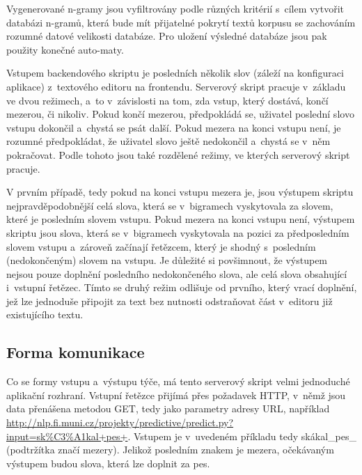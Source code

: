 \documentclass[a4paper,11pt,openany]{book} %
\newcommand\exmp{\textsf}
\begin{document}

Vygenerované n-gramy jsou vyfiltrovány podle různých kritérií s~cílem vytvořit databázi n-gramů, která bude mít přijatelné pokrytí textů korpusu se zachováním rozumné datové velikosti databáze. Pro uložení výsledné databáze jsou pak použity konečné {auto-maty}. \parencite[13]{neverilovaulipova2014}



Vstupem backendového skriptu je posledních několik slov (záleží na konfiguraci aplikace) z~textového editoru na frontendu. Serverový skript pracuje v~základu ve dvou režimech, a~to v~závislosti na tom, zda vstup, který dostává, končí mezerou, či nikoliv. Pokud končí mezerou, předpokládá se, uživatel poslední slovo vstupu dokončil a~chystá se psát další. Pokud mezera na konci vstupu není, je rozumné předpokládat, že uživatel slovo ještě nedokončil a~chystá se v~něm pokračovat. Podle tohoto jsou také rozdělené režimy, ve kterých serverový skript pracuje. 

V prvním případě, tedy pokud na konci vstupu mezera je, jsou výstupem skriptu nejpravděpodobnější celá slova, která se v~bigramech vyskytovala za slovem, které je posledním slovem vstupu. Pokud mezera na konci vstupu není, výstupem skriptu jsou slova, která se v~bigramech vyskytovala na pozici za předposledním slovem vstupu a~zároveň začínají řetězcem, který je shodný s~posledním (nedokončeným) slovem na vstupu. Je důležité si povšimnout, že výstupem nejsou pouze doplnění posledního nedokončeného slova, ale celá slova obsahující i~vstupní řetězec. Tímto se druhý režim odlišuje od prvního, který vrací doplnění, jež lze jednoduše připojit za text bez nutnosti odstraňovat část v~editoru již existujícího textu.

\subsection{Forma komunikace}

Co se formy vstupu a~výstupu týče, má tento serverový skript velmi jednoduché aplikační rozhraní. Vstupní řetězce přijímá přes požadavek HTTP, v~němž jsou data přenášena metodou GET, tedy jako parametry adresy URL, například \url{http://nlp.fi.muni.cz/projekty/predictive/predict.py?input=sk%C3%A1kal+pes+}. Vstupem je v~uvedeném příkladu tedy \exmp{skákal\_pes\_} (podtržítka značí mezery). Jelikož posledním znakem je mezera, očekávaným výstupem budou slova, která lze doplnit za \exmp{pes}. 
\end{document}
